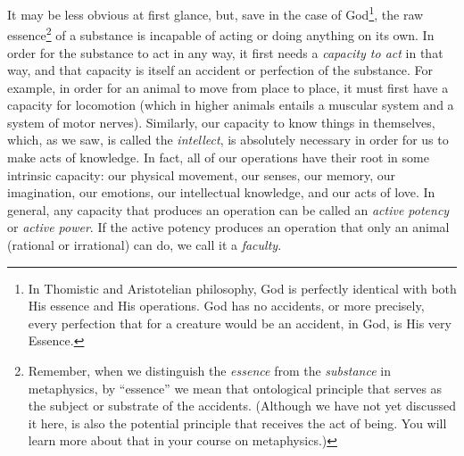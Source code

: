 \documentclass[article,12pt,a4paper,oneside]{memoir}
\begin{document}
    It may be less obvious at first glance, but, save in the case of
    God\footnote{In Thomistic and Aristotelian philosophy, God is
      perfectly identical with both His essence and His operations. God
      has no accidents, or more precisely, every perfection that for a
      creature would be an accident, in God, is His very Essence.}, the
    raw essence\footnote{Remember, when we distinguish the
      \emph{essence} from the \emph{substance} in metaphysics, by
      ``essence'' we mean that ontological principle that serves as the
      subject or substrate of the accidents. (Although we have not yet
      discussed it here, is also the potential principle that receives
      the act of being. You will learn more about that in your course on
      metaphysics.)} of a substance is incapable of acting or doing
    anything on its own. In order for the substance to act in any way,
    it first needs a \emph{capacity to act} in that way, and that
    capacity is itself an accident or perfection of the substance. For
    example, in order for an animal to move from place to place, it must
    first have a capacity for locomotion (which in higher animals
    entails a muscular system and a system of motor nerves). Similarly,
    our capacity to know things in themselves, which, as we saw, is
    called the \emph{intellect}, is absolutely necessary in order for us
    to make acts of knowledge. In fact, all of our operations have their
    root in some intrinsic capacity: our physical movement, our senses,
    our memory, our imagination, our emotions, our intellectual
    knowledge, and our acts of love. In general, any capacity that
    produces an operation can be called an \emph{active potency} or
    \emph{active power}. If the active potency produces an operation
    that only an animal (rational or irrational) can do, we call it a
    \emph{faculty}.
\end{document}
